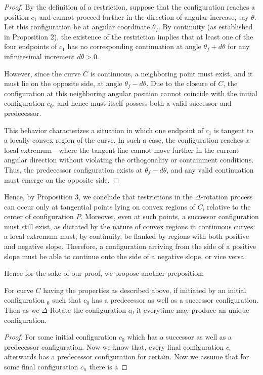 \begin{proof}
By the definition of a restriction, suppose that the configuration reaches a position $c_1$ and cannot proceed further in the direction of angular increase, say $\theta$. Let this configuration be at angular coordinate $\theta_f$. By continuity (as established in Proposition 2), the existence of the restriction implies that at least one of the four endpoints of $c_1$ has no corresponding continuation at angle $\theta_f + d\theta$ for any infinitesimal increment $d\theta > 0$.

However, since the curve $C$ is continuous, a neighboring point must exist, and it must lie on the opposite side, at angle $\theta_f - d\theta$. Due to the closure of $C$, the configuration at this neighboring angular position cannot coincide with the initial configuration $c_0$, and hence must itself possess both a valid successor and predecessor.

This behavior characterizes a situation in which one endpoint of $c_1$ is tangent to a locally convex region of the curve. In such a case, the configuration reaches a local extremum—where the tangent line cannot move further in the current angular direction without violating the orthogonality or containment conditions. Thus, the predecessor configuration exists at $\theta_f - d\theta$, and any valid continuation must emerge on the opposite side.

\end{proof}

Hence, by Proposition 3, we conclude that restrictions in the $\Delta$-rotation process can occur only at tangential points lying on convex regions of $C$, relative to the center of configuration $P$. Moreover, even at such points, a successor configuration must still exist, as dictated by the nature of convex regions in continuous curves: a local extremum must, by continuity, be flanked by regions with both positive and negative slope. Therefore, a configuration arriving from the side of a positive slope must be able to continue onto the side of a negative slope, or vice versa.

Hence for the sake of our proof, we propose another preposition:

\begin{proposition}
For curve $C$ having the properties as described above, if initiated by an initial configuration $_0$ such that $c_0$ has a predecessor as well as a successor configuration. Then as we $\Delta$-Rotate the configuration $c_0$ it everytime may produce an unique configuration.
\end{proposition}
\begin{proof}
For some initial configuration $c_0$ which has a successor as well as a predecessor configuration. Now we know that, every final configuration $c_i$ afterwards has a predecessor configuration for certain.
Now we assume that for some final configuration $c_n$ there is a 
\end{proof}
